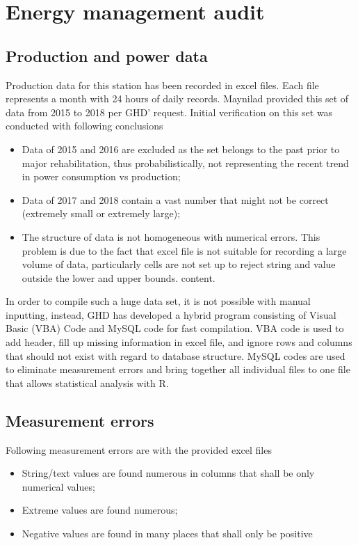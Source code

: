 
\section{Energy management audit}
\label{46}
\subsection{Production and power data}
Production data for this station has been recorded in excel files. Each file represents a month with 24 hours of daily records. Maynilad provided this set of data from 2015 to 2018 per GHD' request. Initial verification on this set was conducted with following conclusions

\begin{itemize}
	\item Data of 2015 and 2016 are excluded as the set belongs to the past prior to major rehabilitation, thus probabilistically, not representing the recent trend in power consumption vs production;
	
	\item Data of 2017 and 2018 contain a vast number that might not be correct (extremely small or extremely large);
	
	\item The structure of data is not homogeneous with numerical errors. This problem is due to the fact that excel file is not suitable for recording a large volume of data, particularly cells are not set up to reject string and value outside the lower and upper bounds.
	content.
\end{itemize}


In order to compile such a huge data set, it is not possible with manual inputting, instead, GHD has developed a hybrid program consisting of Visual Basic (VBA) Code and MySQL code for fast compilation. VBA code is used to add header, fill up missing information in excel file, and ignore rows and columns that should not exist with regard to database structure. MySQL codes are used to eliminate measurement errors and bring together all individual files to one file that allows statistical analysis with R.
\subsection{Measurement errors}
Following measurement errors are with the provided excel files
\begin{itemize}
\item String/text values are found numerous in columns that shall be only numerical values;
\item Extreme values are found numerous;
\item Negative values are found in many places that shall only be positive
\end{itemize}
